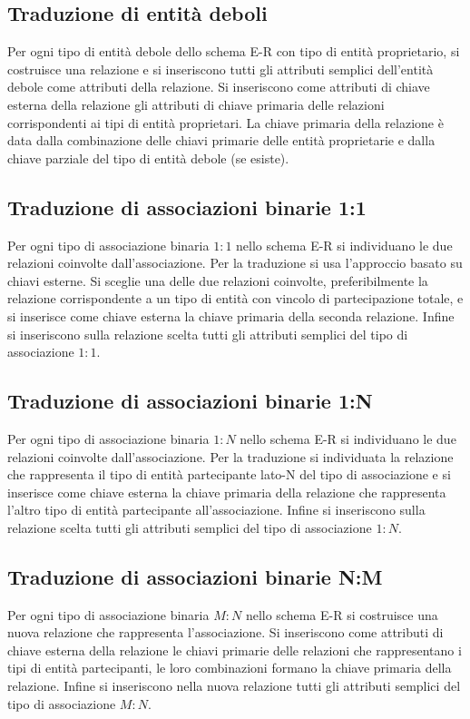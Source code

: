 \subsection{Traduzione di entità deboli}
	Per ogni tipo di entità debole dello schema E-R con tipo di entità proprietario, si costruisce una relazione e si inseriscono tutti gli attributi semplici dell'entità debole come attributi della relazione. Si inseriscono come attributi di chiave esterna della relazione gli attributi di chiave primaria delle relazioni corrispondenti ai tipi di entità proprietari. La chiave primaria della relazione è data dalla combinazione delle chiavi primarie delle entità proprietarie e dalla chiave parziale del tipo di entità debole (se esiste).

\subsection{Traduzione di associazioni binarie 1:1}
	Per ogni tipo di associazione binaria $1:1$ nello schema E-R si individuano le due relazioni coinvolte dall'associazione. Per la traduzione si usa l'approccio basato su chiavi esterne. Si sceglie una delle due relazioni coinvolte, preferibilmente la relazione corrispondente a un tipo di entità con vincolo di partecipazione totale, e si inserisce come chiave esterna la chiave primaria della seconda relazione. Infine si inseriscono sulla relazione scelta tutti gli attributi semplici del tipo di associazione $1:1$.

\subsection{Traduzione di associazioni binarie 1:N}
	Per ogni tipo di associazione binaria $1:N$ nello schema E-R si individuano le due relazioni coinvolte dall'associazione. Per la traduzione si individuata la relazione che rappresenta il tipo di entità partecipante lato-N del tipo di associazione e si inserisce come chiave esterna la chiave primaria della relazione che rappresenta l'altro tipo di entità partecipante all'associazione. Infine si inseriscono sulla relazione scelta tutti gli attributi semplici del tipo di associazione $1:N$.

\subsection{Traduzione di associazioni binarie N:M}
	Per ogni tipo di associazione binaria $M:N$ nello schema E-R si costruisce una nuova relazione che rappresenta l'associazione. Si inseriscono come attributi di chiave esterna della relazione le chiavi primarie delle relazioni che rappresentano i tipi di entità partecipanti, le loro combinazioni formano la chiave primaria della relazione. Infine si inseriscono nella nuova relazione tutti gli attributi semplici del tipo di associazione $M:N$.

